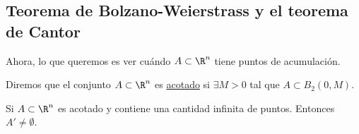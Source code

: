 \subsection{Teorema de Bolzano-Weierstrass y el teorema de Cantor}

Ahora, lo que queremos es ver cuándo $A \subset \R^n$ tiene puntos de acumulación.

\begin{defn}
    Diremos que el conjunto $A \subset \R^n$ es \ul{acotado} si $\exists M > 0$ tal que $A \subset B_2(0, M)$.
\end{defn}

\begin{teo}\label{teo:BW}
    Si $A \subset \R^n$ es acotado y contiene una cantidad infinita de puntos. Entonces $A' \neq \emptyset$.
\end{teo}

